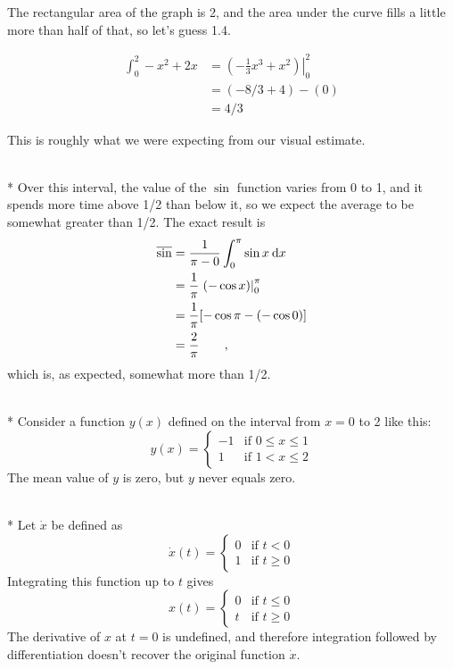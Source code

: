 The rectangular area of the graph is 2, and the area under the curve fills a little more than half of that, so let's guess 1.4.

\begin{align*}
  \int_0^2 -x^2+2x &= \left.\left(-\frac{1}{3}x^3+x^2\right)\right|_0^2 \\
             &= (-8/3+4)-(0) \\
             &= 4/3
\end{align*}

This is roughly what we were expecting from our visual estimate.

\\*
Over this interval, the value of the $\sin$ function varies from 0 to 1, and
it spends more time above 1/2 than below it, so we expect the average to be
somewhat greater than 1/2.
The exact result is
\begin{align*}
  \overline{\sin} &= \frac{1}{\pi-0}\int_0^\pi \sin x\:\textup{d} x \\
             &= \frac{1}{\pi}\left.(- \cos x)\right|_0^\pi \\
             &= \frac{1}{\pi}[-\cos\pi-(-\cos 0)] \\
             &= \frac{2}{\pi} \qquad ,
\end{align*}
which is, as expected, somewhat more than 1/2.

\\*
Consider a function $y(x)$ defined on the interval from $x=0$ to 2 like this:
\begin{equation*}
  y(x) = 
    \begin{cases}
      -1  & \text{if $0\le x \le 1$}\\
      1  & \text{if $1< x \le 2$}
    \end{cases}
\end{equation*}
The mean value of $y$ is zero, but $y$ never equals zero.

\\*
Let $\dot{x}$ be defined as
\begin{equation*}
  \dot{x}(t) = 
    \begin{cases}
      0  & \text{if $t < 0$}\\
      1  & \text{if $t \ge 0$}
    \end{cases}
\end{equation*}
Integrating this function up to $t$ gives
\begin{equation*}
  x(t) = 
    \begin{cases}
      0  & \text{if $t \le 0$}\\
      t  & \text{if $t \ge 0$}
    \end{cases}
\end{equation*}
The derivative of $x$ at $t=0$ is undefined, and therefore
integration followed by differentiation doesn't recover
the original function $\dot{x}$.

